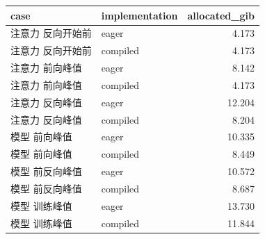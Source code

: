 \begin{tabular}{llr}
\toprule
case & implementation & allocated\_gib \\
\midrule
注意力
反向开始前 & eager & 4.173 \\
注意力
反向开始前 & compiled & 4.173 \\
注意力
前向峰值 & eager & 8.142 \\
注意力
前向峰值 & compiled & 4.173 \\
注意力
反向峰值 & eager & 12.204 \\
注意力
反向峰值 & compiled & 8.204 \\
模型
前向峰值 & eager & 10.335 \\
模型
前向峰值 & compiled & 8.449 \\
模型
前反向峰值 & eager & 10.572 \\
模型
前反向峰值 & compiled & 8.687 \\
模型
训练峰值 & eager & 13.730 \\
模型
训练峰值 & compiled & 11.844 \\
\bottomrule
\end{tabular}
